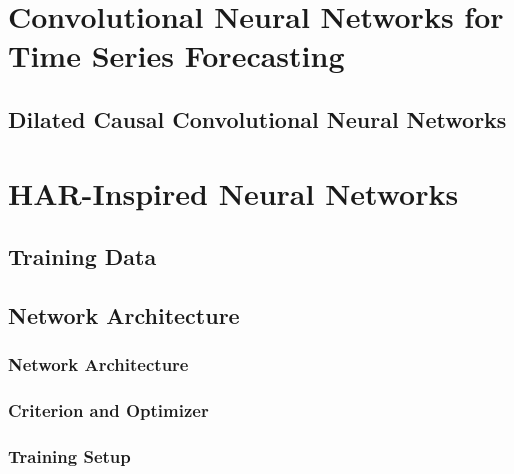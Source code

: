 \subsection{}
\label{sec:org776a452}

\section{Convolutional Neural Networks for Time Series Forecasting}
\label{sec:org60cfbf3}

\subsection{Dilated Causal Convolutional Neural Networks}
\label{sec:org7p624l2}

\section{HAR-Inspired Neural Networks}
\label{sec:orga173d6d}

\subsection{Training Data}
\label{sec:org7s6i422}

\subsection{Network Architecture}
\label{sec:org7dkl4l2}

\subsubsection{Network Architecture}
\label{sec:org7d69392}

\subsubsection{Criterion and Optimizer}
\label{sec:org7d693i2}

\subsubsection{Training Setup}
\label{sec:org7d693s2}
